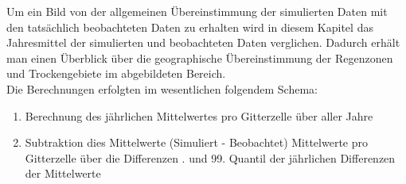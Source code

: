 Um ein Bild von der allgemeinen Übereinstimmung der simulierten Daten mit den tatsächlich beobachteten Daten zu erhalten wird in diesem Kapitel das Jahresmittel der simulierten und beobachteten Daten verglichen. Dadurch erhält man einen Überblick über die geographische Übereinstimmung der Regenzonen und Trockengebiete im abgebildeten Bereich.\\
Die Berechnungen erfolgten im wesentlichen folgendem Schema:
\begin{enumerate}
	\item Berechnung des jährlichen Mittelwertes pro Gitterzelle über aller Jahre
	\item Subtraktion dies Mittelwerte (Simuliert - Beobachtet)
	\subitem[a] Mittelwerte pro Gitterzelle über die Differenzen
	. und 99. Quantil der jährlichen Differenzen der Mittelwerte
\end{enumerate}
